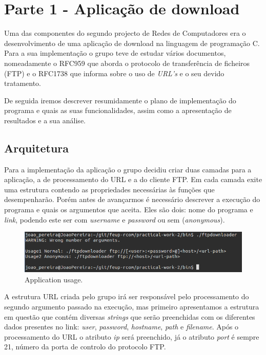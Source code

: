 \documentclass[a4paper]{article}
\begin{document}
\section{Parte 1 - Aplicação de download}
Uma das componentes do segundo projecto de Redes de Computadores era o desenvolvimento de uma aplicação de download na linguagem de programação C. Para a sua implementação o grupo teve de estudar vários documentos, nomeadamente o RFC959 que aborda o protocolo de transferência de ficheiros (FTP)  e o RFC1738 que informa sobre o uso de \textit{URL's} e o seu devido tratamento.

De seguida iremos descrever resumidamente o plano de implementação do programa e quais as suas funcionalidades, assim como a apresentação de resultados e a sua análise.

\subsection{Arquitetura}
Para a implementação da aplicação o grupo decidiu criar duas camadas para a aplicação, a de processamento do URL e a do cliente FTP.
Em cada camada exite uma estrutura contendo as propriedades necessárias às funções que desempenharão.
Porém antes de avançarmos é necessário descrever a execução do programa e quais os argumentos que aceita. Eles são dois: nome do programa e \textit{link}, podendo este ser com \textit{username} e \textit{password} ou  sem (\textit{anonymous}).

\begin{figure}[h!]
\includegraphics[scale=0.5]{res/usage.png}
\caption{Application usage.}
\end{figure}

A estrutura URL criada pelo grupo irá ser responsável pelo processamento do segundo argumento passado na execução, mas primeiro apresentamos a estrutura em questão que contém diversas \textit{strings} que serão preenchidas com os diferentes dados presentes no link: \textit{user}, \textit{password}, \textit{hostname}, \textit{path} e \textit{filename}. Após o processamento do URL o atributo \textit{ip} será preenchido, já o atributo \textit{port} é sempre 21, número da porta de controlo do protocolo FTP.
\end{document}
